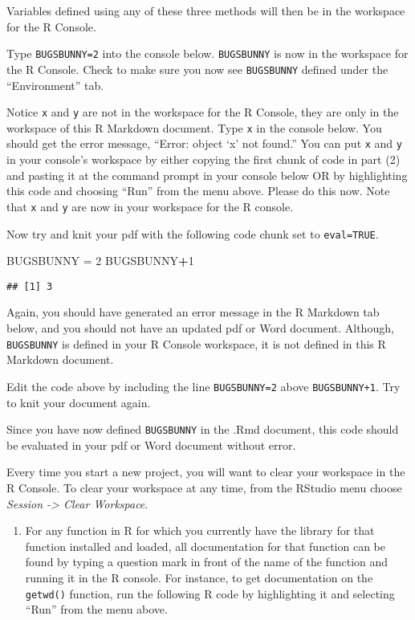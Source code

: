 \documentclass[]{article}
\newenvironment{Shaded}{\begin{snugshade}}{\end{snugshade}}
\newcommand{\DecValTok}[1]{\textcolor[rgb]{0.00,0.00,0.81}{#1}}
\newcommand{\NormalTok}[1]{#1}
\newcommand{\OperatorTok}[1]{\textcolor[rgb]{0.81,0.36,0.00}{\textbf{#1}}}
\newcommand{\StringTok}[1]{\textcolor[rgb]{0.31,0.60,0.02}{#1}}
\providecommand{\tightlist}{%
  \setlength{\itemsep}{0pt}\setlength{\parskip}{0pt}}
\begin{document}
Variables defined using any of these three methods will then be in the
workspace for the R Console.

Type \texttt{BUGSBUNNY=2} into the console below. \texttt{BUGSBUNNY} is
now in the workspace for the R Console. Check to make sure you now see
\texttt{BUGSBUNNY} defined under the ``Environment'' tab.

Notice \texttt{x} and \texttt{y} are not in the workspace for the R
Console, they are only in the workspace of this R Markdown document.
Type \texttt{x} in the console below. You should get the error message,
``Error: object `x' not found.'' You can put \texttt{x} and \texttt{y}
in your console's workspace by either copying the first chunk of code in
part (2) and pasting it at the command prompt in your console below OR
by highlighting this code and choosing ``Run'' from the menu above.
Please do this now. Note that \texttt{x} and \texttt{y} are now in your
workspace for the R console.

Now try and knit your pdf with the following code chunk set to
\texttt{eval=TRUE}.

\begin{Shaded}
\begin{Highlighting}[]
\NormalTok{BUGSBUNNY =}\StringTok{ }\DecValTok{2}
\NormalTok{BUGSBUNNY}\OperatorTok{+}\DecValTok{1}
\end{Highlighting}
\end{Shaded}

\begin{verbatim}
## [1] 3
\end{verbatim}

Again, you should have generated an error message in the R Markdown tab
below, and you should not have an updated pdf or Word document.
Although, \texttt{BUGSBUNNY} is defined in your R Console workspace, it
is not defined in this R Markdown document.

Edit the code above by including the line \texttt{BUGSBUNNY=2} above
\texttt{BUGSBUNNY+1}. Try to knit your document again.

Since you have now defined \texttt{BUGSBUNNY} in the .Rmd document, this
code should be evaluated in your pdf or Word document without error.

Every time you start a new project, you will want to clear your
workspace in the R Console. To clear your workspace at any time, from
the RStudio menu choose \emph{Session -\textgreater{} Clear Workspace}.

\begin{enumerate}
\def\labelenumi{\arabic{enumi}.}
\setcounter{enumi}{3}
\tightlist
\item
  For any function in R for which you currently have the library for
  that function installed and loaded, all documentation for that
  function can be found by typing a question mark in front of the name
  of the function and running it in the R console. For instance, to get
  documentation on the \texttt{getwd()} function, run the following R
  code by highlighting it and selecting ``Run'' from the menu above.
\end{enumerate}
\end{document}
